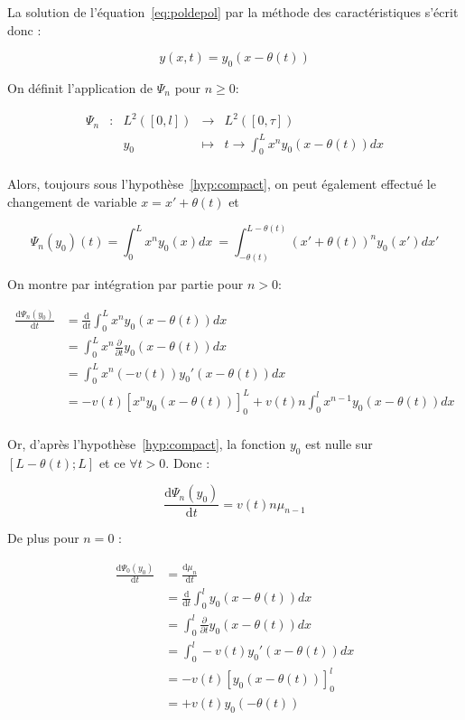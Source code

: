 \documentclass[a4paper]{article}
\theoremstyle{definition}
\theoremstyle{remark}
\begin{document}
La solution de l'équation~\eqref{eq:poldepol} 
par la méthode des caractéristiques s'écrit donc :

\[ y(x,t) = y_0(x- \theta(t)) \]

On définit l'application de $\Psi_n$ pour $n \geq 0$:

 \begin{equation}
	\begin{array}{ccccc}
	\Psi_n & : & L^2([0,l]) & \to & L^2([0,\tau]) \\
	 & & y_0 & \mapsto & t \to \int_0^L x^n y_0(x-\theta(t)) dx\\
	\end{array}
\end{equation}
  
Alors, toujours sous l'hypothèse~\eqref{hyp:compact}, on peut également effectué le changement de variable $x =x'+\theta(t)$ et
  
\[ \Psi_n (y_0) (t) = \int_0^L x^n y_0(x) dx\ = \int_{-\theta(t)}^{L - \theta(t)} (x'+\theta(t))^ny_0(x')dx'\]
  
On montre par intégration par partie pour $n>0$:
  
\[
\begin{split}
	\frac{\mathrm{d} \Psi_n (y_0) }{\mathrm{d}t} &= \frac{\mathrm{d}}{\mathrm{d}t}\int_0^L x^n y_0(x-\theta(t)) dx \\
	                                             &= \int_0^L x^n \frac{\partial}{\partial t}y_0(x-\theta(t)) dx \\
												 &= \int_0^L x^n (-v(t))y_0'(x-\theta(t)) dx \\
												 &= -v(t)[x^n y_0(x-\theta(t))]_0^L + v(t) n \int_0^l x^{n-1} y_0(x-\theta(t)) dx\\
\end{split}
\]

Or, d'après l'hypothèse~\eqref{hyp:compact}, la fonction $y_0$ est nulle sur $[L-\theta(t);L]$ et ce $\forall t >0$. Donc :

\[\frac{\mathrm{d} \Psi_n (y_0) }{\mathrm{d}t}= v(t) n \mu_{n-1}\]

De plus pour $n=0$ :

\[ 
\begin{split}
\frac{\mathrm{d} \Psi_0 (y_0) }{\mathrm{d}t} &= \frac{\mathrm{d} \mu_n }{\mathrm{d}t} \\
                                             &= \frac{\mathrm{d}}{\mathrm{d}t}\int_0^l y_0(x-\theta(t)) dx \\
	                                         &= \int_0^l \frac{\partial}{\partial t}y_0(x-\theta(t)) dx \\
											 &= \int_0^l -v(t)y_0'(x-\theta(t)) dx \\
											 &= -v(t)[y_0(x-\theta(t))]_0^l  \\
											 &= + v(t) y_0(-\theta(t)) 
\end{split}
\]
\end{document}
